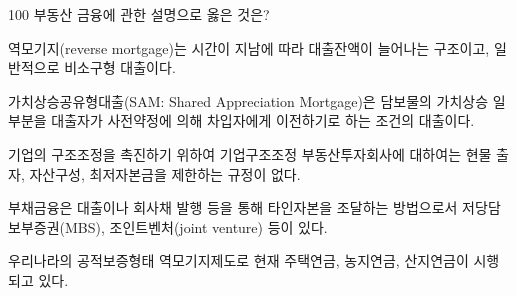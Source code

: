 \begin{question}{100}
부동산 금융에 관한 설명으로 옳은 것은?
\begin{choices}
  \item 역모기지(reverse mortgage)는 시간이 지남에 따라 대출잔액이 늘어나는 구조이고, 일반적으로 비소구형 대출이다.
  \item 가치상승공유형대출(SAM: Shared Appreciation Mortgage)은 담보물의 가치상승 일부분을 대출자가 사전약정에 의해 차입자에게 이전하기로 하는 조건의 대출이다.
  \item 기업의 구조조정을 촉진하기 위하여 기업구조조정 부동산투자회사에 대하여는 현물 출자, 자산구성, 최저자본금을 제한하는 규정이 없다.
  \item 부채금융은 대출이나 회사채 발행 등을 통해 타인자본을 조달하는 방법으로서 저당담보부증권(MBS), 조인트벤처(joint venture) 등이 있다.
  \item 우리나라의 공적보증형태 역모기지제도로 현재 주택연금, 농지연금, 산지연금이 시행되고 있다.
\end{choices}
\end{question}
